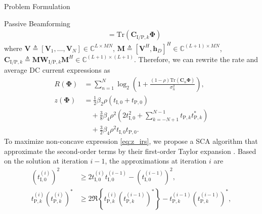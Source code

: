 \documentclass[journal]{IEEEtran}
\begin{document}
\begin{section}{Problem Formulation}
\begin{subsection}{Passive Beamforming}
\begin{align}
				& = \mathrm{Tr}(\boldsymbol{C}_{\mathrm{I/P},k}\boldsymbol{\Phi})
			\end{align}
			where $\boldsymbol{V} \triangleq [\boldsymbol{V}_1,\dots,\boldsymbol{V}_N] \in \mathbb{C}^{L \times MN}$, $\boldsymbol{M} \triangleq [\boldsymbol{V}^H, \boldsymbol{h}_{D}]^H \in \mathbb{C}^{(L+1) \times MN}$, $\boldsymbol{C}_{\mathrm{I/P},k} \triangleq \boldsymbol{M}\boldsymbol{W}_{\mathrm{I/P},k}\boldsymbol{M}^H \in \mathbb{C}^{(L+1)\times(L+1)}$. Therefore, we can rewrite the rate and average DC current expressions as
			\begin{align}
				R(\boldsymbol{\Phi})
				& = \sum_{n=1}^{N}{\log_2\left(1+\frac{(1-\rho)\mathrm{Tr}(\boldsymbol{C}_n\boldsymbol{\Phi})}{\sigma_n^2}\right)},\label{eq:R_irs}\\
				z(\boldsymbol{\Phi})
				& = \frac{1}{2}{\beta_2}{\rho}(t_{\mathrm{I},0}+t_{\mathrm{P},0})\nonumber\\
				& \quad + \frac{3}{8}{\beta_4}{\rho^2} \left(2t_{\mathrm{I},0}^2 + \sum_{k=-N+1}^{N-1}{t_{\mathrm{P},k}t_{\mathrm{P},k}^*}\right)\nonumber\\
				& \quad + \frac{3}{2}{\beta_4}{\rho^2}t_{\mathrm{I},0}t_{\mathrm{P},0}.\label{eq:z_irs}
			\end{align}
			To maximize non-concave expression \eqref{eq:z_irs}, we propose a SCA algorithm that approximate the second-order terms by their first-order Taylor expansion \cite{Adali2010}. Based on the solution at iteration $i - 1$, the approximations at iteration $i$ are
			\begin{align}
				(t_{\mathrm{I},0}^{(i)})^2
				& \ge 2 t_{\mathrm{I},0}^{(i)}t_{\mathrm{I},0}^{(i-1)} - (t_{\mathrm{I},0}^{(i-1)})^2,\label{eq:taylor_1}\\
				t_{\mathrm{P},k}^{(i)} (t_{\mathrm{P},k}^{(i)})^*
				& \ge 2 \Re\left\{t_{\mathrm{P},k}^{(i)} (t_{\mathrm{P},k}^{(i-1)})^*\right\} - t_{\mathrm{P},k}^{(i-1)} (t_{\mathrm{P},k}^{(i-1)})^*,\label{eq:taylor_2}\\

\end{align}
\end{subsection}
\end{section}
\end{document}
